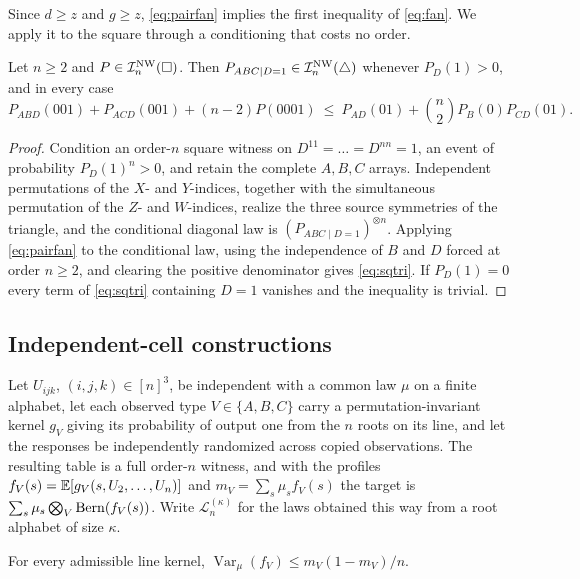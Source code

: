 Since $d\ge z$ and $g\ge z$, \eqref{eq:pairfan} implies the first inequality of \eqref{eq:fan}. We apply it to the square through a conditioning that costs no order.

\begin{lemma}\label{lem:sqtri}
Let $n\ge2$ and $P\in\mathcal I^{\mathrm{NW}}_n(\square)$. Then $P_{ABC\mid D=1}\in\mathcal I^{\mathrm{NW}}_n(\triangle)$ whenever $P_D(1)>0$, and in every case
\begin{equation}\label{eq:sqtri}
P_{ABD}(001)+P_{ACD}(001)+(n-2)P(0001)\ \le\ P_{AD}(01)+\binom n2P_B(0)P_{CD}(01).
\end{equation}
\end{lemma}

\begin{proof}
Condition an order-$n$ square witness on $D^{11}=\dots=D^{nn}=1$, an event of probability $P_D(1)^n>0$, and retain the complete $A,B,C$ arrays. Independent permutations of the $X$- and $Y$-indices, together with the simultaneous permutation of the $Z$- and $W$-indices, realize the three source symmetries of the triangle, and the conditional diagonal law is $(P_{ABC\mid D=1})^{\otimes n}$. Applying \eqref{eq:pairfan} to the conditional law, using the independence of $B$ and $D$ forced at order $n\ge2$, and clearing the positive denominator gives \eqref{eq:sqtri}. If $P_D(1)=0$ every term of \eqref{eq:sqtri} containing $D=1$ vanishes and the inequality is trivial.
\end{proof}


\subsection{Independent-cell constructions}

Let $U_{ijk}$, $(i,j,k)\in[n]^3$, be independent with a common law $\mu$ on a finite alphabet, let each observed type $V\in\{A,B,C\}$ carry a permutation-invariant kernel $g_V$ giving its probability of output one from the $n$ roots on its line, and let the responses be independently randomized across copied observations. The resulting table is a full order-$n$ witness, and with the profiles $f_V(s)=\mathbb E[g_V(s,U_2,\dots,U_n)]$ and $m_V=\sum_s\mu_sf_V(s)$ the target is $\sum_s\mu_s\bigotimes_V\operatorname{Bern}(f_V(s))$. Write $\mathcal L_n^{(\kappa)}$ for the laws obtained this way from a root alphabet of size $\kappa$.

\begin{lemma}\label{lem:cellvar}
For every admissible line kernel, $\operatorname{Var}_\mu(f_V)\le m_V(1-m_V)/n$.
\end{lemma}


